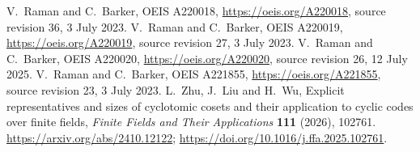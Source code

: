  V.~Raman and C.~Barker, OEIS A220018, \url{https://oeis.org/A220018}, source revision 36, 3 July 2023.
 V.~Raman and C.~Barker, OEIS A220019, \url{https://oeis.org/A220019}, source revision 27, 3 July 2023.
 V.~Raman and C.~Barker, OEIS A220020, \url{https://oeis.org/A220020}, source revision 26, 12 July 2025.
 V.~Raman and C.~Barker, OEIS A221855, \url{https://oeis.org/A221855}, source revision 23, 3 July 2023.
 L.~Zhu, J.~Liu and H.~Wu, Explicit representatives and sizes of cyclotomic cosets and their application to cyclic codes over finite fields, \emph{Finite Fields and Their Applications} \textbf{111} (2026), 102761. \url{https://arxiv.org/abs/2410.12122}; \url{https://doi.org/10.1016/j.ffa.2025.102761}.
